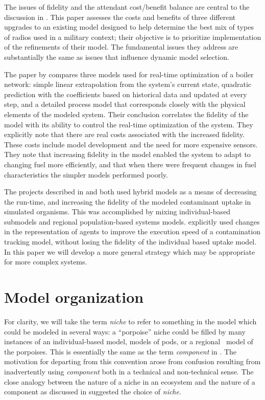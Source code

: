 The issues of fidelity and the attendant cost/benefit balance are
central to the dis\-cus\-sion in \cite{bailey1992scientific}.  This paper
assesses the costs and benefits of three dif\-fer\-ent upgrades to an
existing model designed to help de\-ter\-mine the best mix of types of
radios used in a mil\-i\-tary con\-text; their ob\-jec\-tive is to prioritize
im\-ple\-men\-ta\-tion of the refinements of their model. The fun\-da\-men\-tal
issues they address are substantially the same as issues that
in\-flu\-ence dynamic model selection.

The paper by \cite{yip2004effect} compares three models used for
real-time optimization of a boiler network: simple linear
extrapolation from the system's current state, quadratic prediction
with the coefficients based on historical data and updated at every
step, and a detailed process model that corresponds closely with the
physical elements of the modeled system. Their conclusion correlates
the fidelity of the model with its ability to control the real-time
optimization of the system. They explicitly note that there are real
costs associated with the increased fidelity. These costs include
model development and the need for more expensive sensors. They note
that increasing fidelity in the model enabled the system to adapt to
changing fuel more efficiently, and that when there were frequent
changes in fuel characteristics the simpler models performed poorly.

The projects described in \cite{Little2006nws} and \cite{Fulton2011ningaloo}
both used hybrid models as a means of decreasing the run-time, and
increasing the fidelity of the modeled contaminant uptake in 
simulated organisms. This was accomplished by mixing in\-di\-vidu\-al-based
sub\-models and regional population-based systems
models. \cite{Gray2012adaptive} explicitly used changes in the rep\-re\-sentation
of agents to improve the execution speed of a contamination tracking
model, without losing the fidelity of the in\-di\-vidu\-al based uptake
model. In this paper we will develop a more general strategy which may
be appropriate for more complex systems.


\section{Model organization}

For clarity, we will take the term \emph{niche} to refer to something
in the model which could be modeled in several ways: a ``porpoise''
niche could be filled by many instances of an in\-di\-vidu\-al-based
model, models of pods, or a regional \SD\ model of the porpoises.
This is essentially the same as the term \emph{component} in
\cite{vincenot2011theoretical}. The motivation for departing from this
convention arose from confusion resulting from inadvertently using
\emph{component} both in a technical and non-technical sense.  The
close analogy between the nature of a niche in an ecosystem and the
nature of a component as discussed in \cite{vincenot2011theoretical}
suggested the choice of \emph{niche}. 


